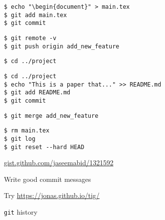 \documentclass{beamer}
\begin{document}
\begin{frame}[fragile]{}
    \begin{verbatim}
$ echo "\begin{document}" > main.tex
$ git add main.tex
$ git commit
    \end{verbatim}
\end{frame}

\begin{frame}[fragile]{}
    \begin{verbatim}
$ git remote -v
$ git push origin add_new_feature
    \end{verbatim}
\end{frame}

\begin{frame}[fragile]{}
    \begin{verbatim}
$ cd ../project
    \end{verbatim}
\end{frame}

\begin{frame}[fragile]{}
    \begin{verbatim}
$ cd ../project
$ echo "This is a paper that..." >> README.md
$ git add README.md
$ git commit
    \end{verbatim}
\end{frame}

\begin{frame}[fragile]{}
    \begin{verbatim}
$ git merge add_new_feature
    \end{verbatim}
\end{frame}

\begin{frame}[fragile]{}
    \begin{verbatim}
$ rm main.tex
$ git log
$ git reset --hard HEAD
    \end{verbatim}
\end{frame}

\begin{frame}[fragile]{}
    \begin{center}
        \Large
        \url{gist.github.com/jaseemabid/1321592}
    \end{center}
\end{frame}

\begin{frame}
    \Large
    \begin{center}
    Write good commit messages
    \end{center}
\end{frame}

\begin{frame}
    \Large
    \begin{center}
    Try \url{https://jonas.github.io/tig/}
    \end{center}
\end{frame}

\begin{frame}
    \Huge
    \begin{center}
    \texttt{git} history
    \end{center}
\end{frame}
\end{document}
